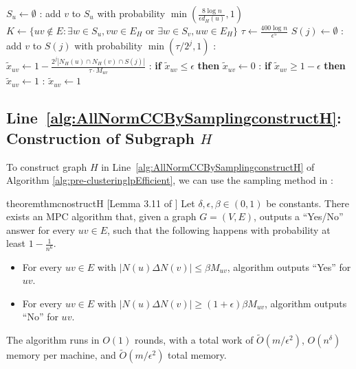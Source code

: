 \documentclass[11pt]{article}
\begin{document}
\begin{CJK*}{UTF8}{gbsn}
\begin{algorithm}[ht!]
\begin{algorithmic}[1]
 
    \label{alg:AllNormCCBySamplingboundnegativeedgesstart}
    \State $S_u \leftarrow \emptyset$
    : add $v$ to $S_u$ with probability $\min(\frac{8\log n}{\epsilon d_H(u)}, 1)$
        \EndFor
\EndFor
    \State $K \gets \{uv \notin E: \exists w \in S_u, vw \in E_H\text{ or } \exists w \in S_v, uw \in E_H\}$ \bigskip
    \label{alg:AllNormCCBySamplingboundnegativeedgesend}
    \State $\tau \leftarrow \frac{400\log n}{\epsilon^5}$      \label{alg:AllNormCCBySamplingsetlpvaluestart} 
    \State $S(j) \leftarrow \emptyset$
    : add $v$ to $S(j)$ with probability $\min(\tau / 2^j, 1)$
    \EndFor
    \For{every $uv \in E \cup K$ with $M_{uv} \in [2^{j-1}, 2^j)$}:
$\tilde{x}_{uv} \leftarrow 1 - \frac{2^j|N_H(u) \cap N_H(v) \cap S(j)|}{\tau \cdot M_{uv}}$
\EndFor
    \EndFor
    : \textbf{if} $\tilde{x}_{uv} \leq \epsilon$ \textbf{then} $\tilde{x}_{uv} \leftarrow 0$ \EndFor
    \label{alg:AllNormCCBySamplingRoundingstart}
    : \textbf{if} $\tilde{x}_{uv} \geq 1 - \epsilon$ \textbf{then} $\tilde{x}_{uv} \leftarrow 1$ \EndFor
    \label{alg:AllNormCCBySamplingRoundingmid}
    : 
        $\tilde{x}_{uv} \leftarrow 1$
    \EndFor
    \label{alg:AllNormCCBySamplingsetlpvalueend}
    \EndFunction
\end{algorithmic}
\end{algorithm}



\subsection{Line~\ref{alg:AllNormCCBySamplingconstructH}: Construction of Subgraph $H$}
To construct graph $H$ in Line~\ref{alg:AllNormCCBySamplingconstructH} of Algorithm \ref{alg:pre-clusteringlpEfficient}, we can use the sampling method in \cite{cohen2021correlation}:

\begin{restatable}{theorem}{thmcnostructH} [Lemma 3.11 of \cite{cohen2021correlation}]
\label{theorem:constructHbysampling}
Let $\delta, \epsilon, \beta \in (0, 1)$ be constants. There exists an MPC algorithm that, given a graph $G = (V, E)$, outputs a ``Yes/No'' answer for every $uv \in E$, such that the following happens with probability at least $1 - \frac{1}{n^6}$.
\begin{itemize}
    \item For every $uv \in E$ with $|N(u) \Delta N(v)| \leq \beta M_{uv}$, algorithm outputs ``Yes'' for $uv$.
    \item For every $uv \in E$ with $|N(u) \Delta N(v)| \geq (1+\epsilon) \beta M_{uv}$, algorithm outputs ``No'' for $uv$. 
\end{itemize}
The algorithm runs in $O(1)$ rounds, with a total work of $\tilde{O}(m/ \epsilon^2)$, $O(n^\delta)$ memory per machine, and $\tilde{O}(m/\epsilon^2)$ total memory.
\end{restatable}


\end{CJK*}
\end{document}
